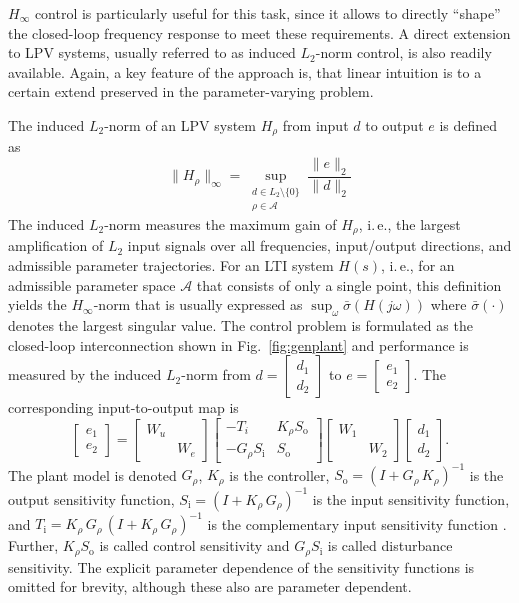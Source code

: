 \documentclass[times]{weauth}
\newcommand{\ba}{\left [ \begin{array}}
\newcommand{\ea}{\end{array} \right ]}
\begin{document}
$H_\infty$ control is particularly useful for this task, since it allows to directly ``shape'' the closed-loop frequency response to meet these requirements. A direct extension to LPV systems, usually referred to as induced $L_2$-norm control, is also readily available. Again, a key feature of the approach is, that linear intuition is to a certain extend preserved in the parameter-varying problem.

The induced $L_2$-norm of an LPV system $H_\rho$ from input $d$ to output $e$ is defined as
\begin{equation}
	\|H_\rho\|_\infty =  \sup_{
	\begin{smallmatrix}
	d \in L_2 \setminus \{0\} \\ \rho\in\mathcal{A} 
	\end{smallmatrix}
	}
	\frac{\|e\|_2}{\|d\|_2}
\end{equation}
The induced $L_2$-norm measures the maximum gain of $H_\rho$, i.\,e., the largest
amplification of $L_2$ input signals over all frequencies, input/output directions, and admissible parameter trajectories. 
For an LTI system $H(s)$, i.\,e., for an admissible parameter space $\mathcal{A}$ that consists of only a single point, this definition yields the $H_\infty$-norm that is usually expressed as $\sup_\omega \bar{\sigma}(H(j \omega))$ where $\bar{\sigma}(\cdot)$ denotes the largest singular value.
The control problem is formulated as the closed-loop
interconnection shown in Fig.~\ref{fig:genplant} and performance is measured
by the induced $L_2$-norm from $d=[\begin{smallmatrix} d_1 \\ d_2 \end{smallmatrix}]$ to $e=[\begin{smallmatrix} e_1 \\ e_2 \end{smallmatrix}]$. 
The corresponding input-to-output map is
\begin{equation}\label{eq:genp}
	\ba{cc}  e_1 \\  e_2 \ea =
	\ba{cc} W_u &   \\    & W_e   \ea
	\ba{cc} -T_i &  K_\rho S_{\text{o}} \\ -G_\rho S_{\text{i}}   & S_{\text{o}}   \ea
	\ba{cc} W_1 &   \\    & W_2   \ea
	\ba{cc}  d_1  \\ d_2 \ea.
\end{equation}
The plant model is denoted $G_\rho$, $K_\rho$ is the controller, $S_\text{o} =
(I+G_\rho\,K_\rho)^{-1}$ is the output sensitivity function, $S_{\text{i}} = (I+K_\rho\,G_\rho)^{-1}$  is the input sensitivity function, and $T_{\text{i}} = K_\rho\,G_\rho\,
(I+K_\rho\,G_\rho)^{-1}$ is the complementary input sensitivity function \cite{Skoge_05}. 
Further, $K_\rho S_\text{o}$ is called control sensitivity and $G_\rho S_\text{i}$ is called disturbance sensitivity. The explicit parameter dependence of the sensitivity functions is omitted for brevity, although these also are parameter dependent.
\end{document}
